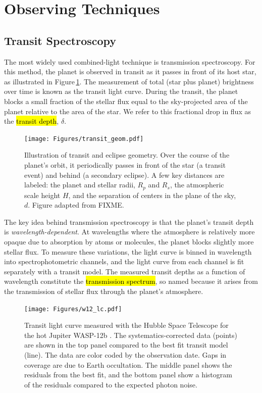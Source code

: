 \documentclass[graybox,natbib,nosecnum]{svmult}
\newcommand{\hbindex}[1]{\hl{#1}\index{#1}}  %
\begin{document}
\section{Observing Techniques} 

\subsection{Transit Spectroscopy}
The most widely used combined-light technique is transmission spectroscopy. For this method, the planet is observed in transit as it passes in front of its host star, as illustrated in Figure\,\ref{fig:geom}.  The measurement of total (star plus planet) brightness over time is known as the transit light curve.  During the transit, the planet blocks a small fraction of the stellar flux equal to the sky-projected area of the planet relative to the area of the star. We refer to this fractional drop in flux as the \hbindex{transit depth}, $\delta$. 

\begin{figure}
\begin{centering}
\texttt{[image: Figures/transit\_geom.pdf]}
\caption{Illustration of transit and eclipse geometry. Over the course of the planet's orbit, it periodically passes in front of the star (a transit event) and behind (a secondary eclipse). A few key distances are labeled: the planet and stellar radii, $R_p$ and $R_s$, the atmospheric scale height $H$, and the separation of centers in the plane of the sky, $d$. Figure adapted from FIXME.}
\label{fig:geom}       
\end{centering}
\end{figure}

The key idea behind transmission spectroscopy is that the planet's transit depth is \emph{wavelength-dependent}.  At wavelengths where the atmosphere is relatively more opaque due to absorption by atoms or molecules, the planet blocks slightly more stellar flux.  To measure these variations, the light curve is binned in wavelength into spectrophotometric channels, and the light curve from each channel is fit separately with a transit model.  The measured transit depths as a function of wavelength constitute the \hbindex{transmission spectrum}, so named because it arises from the transmission of stellar flux through the planet's atmosphere.
 
\begin{figure}
\begin{centering}
\texttt{[image: Figures/w12\_lc.pdf]}
\caption{Transit light curve measured with the Hubble Space Telescope for the hot Jupiter WASP-12b \citep{kreidberg15b}. The systematics-corrected data (points) are shown in the top panel compared to the best fit transit model (line). The data are color coded by the observation date. Gaps in coverage are due to Earth occultation. The middle panel shows the residuals from the best fit, and the bottom panel show a histogram of the residuals compared to the expected photon noise.}
\label{fig:lc}       
\end{centering}
\end{figure}
\end{document}
